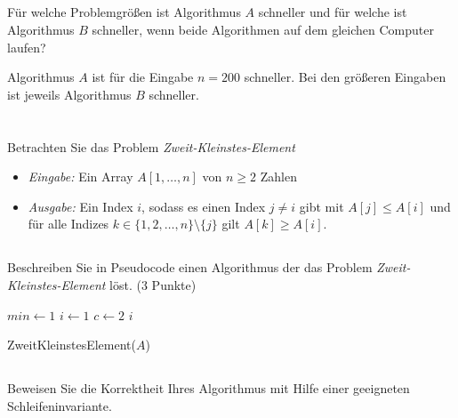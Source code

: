 \documentclass[12pt]{article}
\theoremstyle{remark}
\begin{document}
\subsection{}

Für welche Problemgrößen ist Algorithmus $A$ schneller und für welche ist Algorithmus $B$ schneller, wenn beide Algorithmen auf dem gleichen Computer laufen?

Algorithmus $A$ ist für die Eingabe $n = 200$ schneller. Bei den größeren Eingaben ist jeweils Algorithmus $B$ schneller.  

\section{}

Betrachten Sie das Problem {\it Zweit-Kleinstes-Element}
\begin{itemize}
    \item {\it Eingabe:} Ein Array $A[1, \ldots, n]$ von $n \geq 2$ Zahlen
    
    \item {\it Ausgabe:} Ein Index $i$, sodass es einen Index $j \neq i$ gibt mit $A[j] \leq A[i]$ und für alle Indizes $k \in \{ 1, 2, \ldots , n \} \setminus \{ j \}$ gilt $A[k] \geq A[i]$.

\end{itemize}

\subsection{}

Beschreiben Sie in Pseudocode einen Algorithmus der das Problem {\it Zweit-Kleinstes-Element} löst. (3 Punkte) \\

\begin{algorithm}[H]
\SetAlgoLined

 $min \gets 1$\; %
 $i \gets 1$\; %
 $c \gets 2$\;
 \Return $i$\;
\caption{ZweitKleinstesElement($A$)}
\end{algorithm}

\subsection{} Beweisen Sie die Korrektheit Ihres Algorithmus mit Hilfe einer geeigneten Schleifeninvariante.
\end{document}
